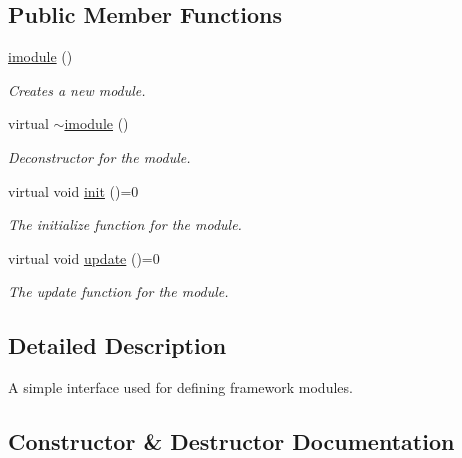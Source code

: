 \subsection*{Public Member Functions}
\begin{DoxyCompactItemize}
\item 
\hyperlink{classflounder_1_1imodule_aa0b5648a6adbcf8c333820d967a37aeb}{imodule} ()
\begin{DoxyCompactList}\small\item\em Creates a new module. \end{DoxyCompactList}\item 
virtual \hyperlink{classflounder_1_1imodule_a519b8530d27d6c21d591e12e776ef834}{$\sim$imodule} ()
\begin{DoxyCompactList}\small\item\em Deconstructor for the module. \end{DoxyCompactList}\item 
virtual void \hyperlink{classflounder_1_1imodule_a1725ef346952884d0741de61aba1e0c7}{init} ()=0
\begin{DoxyCompactList}\small\item\em The initialize function for the module. \end{DoxyCompactList}\item 
virtual void \hyperlink{classflounder_1_1imodule_a9a53d48a46b5f6b16a92b2cd8503f74a}{update} ()=0
\begin{DoxyCompactList}\small\item\em The update function for the module. \end{DoxyCompactList}\end{DoxyCompactItemize}


\subsection{Detailed Description}
A simple interface used for defining framework modules. 



\subsection{Constructor \& Destructor Documentation}
\mbox{\label{classflounder_1_1imodule_aa0b5648a6adbcf8c333820d967a37aeb}} 

